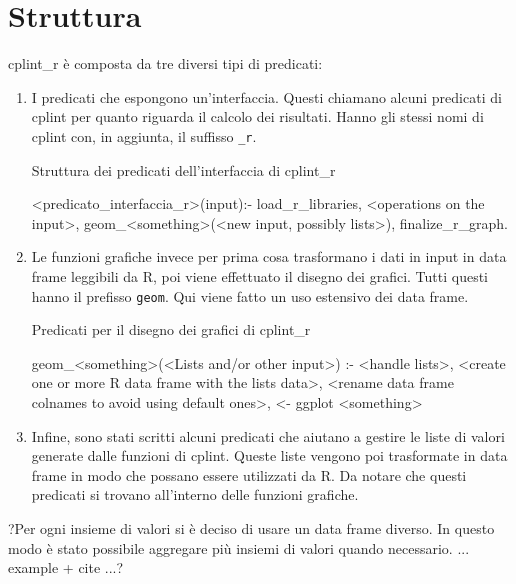 \documentclass[10pt,titlepage,twoside,a4paper]{report}
\newenvironment{code}{\singlespacing\captionsetup{type=listing}}{}
\begin{document}
\section{Struttura}
cplint\_r è composta da tre diversi tipi di predicati:
\begin{enumerate}
    \item I predicati che espongono un'interfaccia. Questi chiamano alcuni 
          predicati di cplint per quanto riguarda il calcolo dei risultati. 
          Hanno gli stessi nomi di cplint con, in aggiunta, il suffisso 
          \texttt{\_r}.

        \begin{code}
            \caption{Struttura dei predicati dell'interfaccia di cplint\_r}
            \begin{prologcode*}{}
<predicato_interfaccia_r>(input):-
    load_r_libraries,
    <operations on the input>,
    geom_<something>(<new input, possibly lists>),
    finalize_r_graph.
            \end{prologcode*}
        \end{code}
    \item Le funzioni grafiche invece per prima cosa trasformano i dati in 
          input in data frame leggibili da R, poi viene effettuato il disegno 
          dei grafici. Tutti questi hanno il prefisso \texttt{geom}. Qui viene 
fatto un uso estensivo dei data frame.

    \begin{code}
        \caption{Predicati per il disegno dei grafici di cplint\_r}
        \begin{prologcode*}{}
geom_<something>(<Lists and/or other input>) :-
    <handle lists>,
    <create one or more R data frame with the lists data>,
    <rename data frame colnames to avoid using default ones>,
    <- ggplot <something>
        \end{prologcode*}
    \end{code}
    \item Infine, sono stati scritti alcuni predicati che aiutano a gestire le 
          liste di valori generate dalle funzioni di cplint. Queste liste 
          vengono poi trasformate in data frame in modo che possano 
          essere utilizzati da R. Da notare che questi predicati si trovano 
          all'interno delle funzioni grafiche.
\end{enumerate}

?Per ogni insieme di valori si è deciso di usare un data frame diverso. In 
questo modo è stato possibile aggregare più insiemi di valori quando 
necessario. ... example + cite ...?
\end{document}
